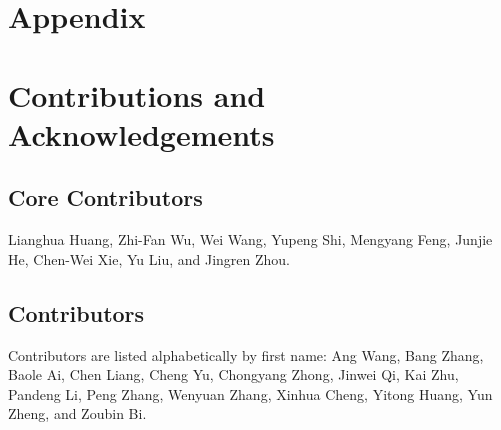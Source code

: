 \documentclass[]{style/style}
\begin{document}
\clearpage
\newpage



\clearpage
\newpage

\appendix
\section*{Appendix}

\section{Contributions and Acknowledgements}
\label{app:contributions-and-acknowledgements}

\subsection{Core Contributors}
Lianghua Huang, Zhi-Fan Wu, Wei Wang, Yupeng Shi, Mengyang Feng, Junjie He, Chen-Wei Xie, Yu Liu, and Jingren Zhou.

\subsection{Contributors}
Contributors are listed alphabetically by first name: Ang Wang, Bang Zhang, Baole Ai, Chen Liang, Cheng Yu, Chongyang Zhong, Jinwei Qi, Kai Zhu, Pandeng Li, Peng Zhang, Wenyuan Zhang, Xinhua Cheng, Yitong Huang, Yun Zheng, and Zoubin Bi.
\end{document}
